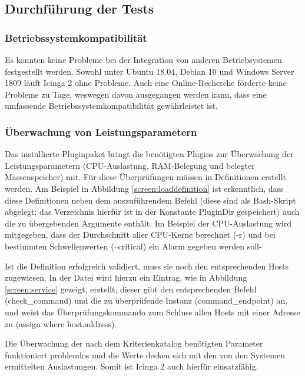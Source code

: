 \subsection{Durchführung der Tests}
\label{sec:DurchführungTests}

\subsubsection{Betriebssystemkompatibilität}
\label{sec:oscompatibility}
Es konnten keine Probleme bei der Integration von anderen Betriebsystemen festgestellt werden. Sowohl unter Ubuntu 18.04, Debian 10 und Windows Server 1809 läuft \glqq{}Icinga 2\grqq{} ohne Probleme. Auch eine Online-Recherche förderte keine Probleme zu Tage, weswegen davon ausgegangen werden kann, dass eine umfassende Betriebssystemkompatibilität gewährleistet ist.

\subsubsection{Überwachung von Leistungsparametern}
\label{sec:ÜberwachungLeistungsparameter}
Das installierte Pluginpaket  bringt die benötigten Plugins zur Überwachung der Leistungsparametern (\ac{CPU}-Auslastung, RAM-Belegung und belegter Massenspeicher) mit. Für diese Überprüfungen müssen in  Definitionen erstellt werden. Am Beispiel in Abbildung \ref{screen:loaddefinition} ist erkenntlich, dass diese Definitionen neben dem auszuführendem Befehl (diese sind als Bash-Skript abgelegt; das Verzeichnis hierfür ist in der Konstante \glqq{}PluginDir\grqq{} gespeichert) auch die zu übergebenden Argumente enthält. Im Beispiel der \ac{CPU}-Auslastung wird mitgegeben, dass der Durchschnitt aller \ac{CPU}-Kerne berechnet (-r) und bei bestimmten Schwellenwerten (--critical) ein Alarm gegeben werden soll-

Ist die Definition erfolgreich validiert, muss sie noch den entsprechenden Hosts zugewiesen. In der Datei  wird hierzu ein Eintrag, wie in Abbildung \ref{screen:service} gezeigt, erstellt; dieser gibt den entsprechenden Befehl (check\_{}command) und die zu überprüfende Instanz (command\_{}endpoint) an, und weist das Überprüfungskommando zum Schluss allen Hosts mit einer Adresse zu (assign where host.address).

Die Überwachung der nach dem Kriterienkatalog benötigten Parameter funktioniert problemlos und die Werte decken sich mit den von den Systemen ermittelten Auslastungen. Somit ist \glqq{}Icinga 2\grqq{} auch hierfür einsatzfähig.

